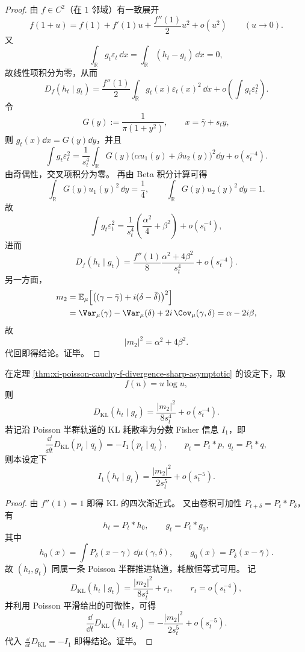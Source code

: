 \begin{proof}
由 \(f\in C^2\)（在 \(1\) 邻域）有一致展开
\[
f(1+u)=f(1)+f'(1)u+\frac{f''(1)}{2}u^2+o(u^2)\qquad(u\to0).
\]
又
\[
\int_{\mathbb R}g_t\varepsilon_t\,\dd x
=\int_{\mathbb R}(h_t-g_t)\,\dd x=0,
\]
故线性项积分为零，从而
\[
D_f(h_t\mid g_t)
=\frac{f''(1)}{2}\int_{\mathbb R}g_t(x)\varepsilon_t(x)^2\,\dd x
+o\!\left(\int g_t\varepsilon_t^2\right).
\]
令
\[
G(y):=\frac{1}{\pi(1+y^2)},
\qquad
x=\bar\gamma+s_t y,
\]
则 \(g_t(x)\dd x=G(y)\dd y\)，并且
\[
\int g_t\varepsilon_t^2
=\frac{1}{s_t^4}\int_{\mathbb R}G(y)\bigl(\alpha u_1(y)+\beta u_2(y)\bigr)^2\dd y
+o(s_t^{-4}).
\]
由奇偶性，交叉项积分为零。
再由 Beta 积分计算可得
\[
\int_{\mathbb R}G(y)u_1(y)^2\,\dd y=\frac14,
\qquad
\int_{\mathbb R}G(y)u_2(y)^2\,\dd y=1.
\]
故
\[
\int g_t\varepsilon_t^2
=\frac{1}{s_t^4}\left(\frac{\alpha^2}{4}+\beta^2\right)
+o(s_t^{-4}),
\]
进而
\[
D_f(h_t\mid g_t)
=\frac{f''(1)}{8}\frac{\alpha^2+4\beta^2}{s_t^4}
+o(s_t^{-4}).
\]
另一方面，
\[
\begin{aligned}
m_2
&=\mathbb E_\mu\!\left[\bigl((\gamma-\bar\gamma)+i(\delta-\bar\delta)\bigr)^2\right]\\
&=\Var_\mu(\gamma)-\Var_\mu(\delta)+2i\,\Cov_\mu(\gamma,\delta)
=\alpha-2i\beta,
\end{aligned}
\]
故
\[
|m_2|^2=\alpha^2+4\beta^2.
\]
代回即得结论。证毕。
\end{proof}

\begin{corollary}\label{cor:xi-poisson-cauchy-kl-fractional-fisher-fifth-law}
在定理 \ref{thm:xi-poisson-cauchy-f-divergence-sharp-asymptotic} 的设定下，取
\[
f(u)=u\log u,
\]
则
\[
D_{\mathrm{KL}}(h_t\mid g_t)
=\frac{|m_2|^2}{8s_t^4}
+o(s_t^{-4}).
\]
若记沿 Poisson 半群轨道的 KL 耗散率为分数 Fisher 信息 \(I_1\)，即
\[
\frac{\dd}{\dd t}D_{\mathrm{KL}}(p_t\mid q_t)=-I_1(p_t\mid q_t),
\qquad p_t=P_t*p,\ q_t=P_t*q,
\]
则本设定下
\[
I_1(h_t\mid g_t)
=\frac{|m_2|^2}{2s_t^5}
+o(s_t^{-5}).
\]
\end{corollary}
\begin{proof}
由 \(f''(1)=1\) 即得 KL 的四次渐近式。
又由卷积可加性 \(P_{t+\delta}=P_t*P_\delta\)，有
\[
h_t=P_t*h_0,\qquad
g_t=P_t*g_0,
\]
其中
\[
h_0(x)=\int P_\delta(x-\gamma)\,\dd\mu(\gamma,\delta),
\qquad
g_0(x)=P_{\bar\delta}(x-\bar\gamma).
\]
故 \((h_t,g_t)\) 同属一条 Poisson 半群推进轨道，耗散恒等式可用。
记
\[
D_{\mathrm{KL}}(h_t\mid g_t)=\frac{|m_2|^2}{8s_t^4}+r_t,\qquad r_t=o(s_t^{-4}),
\]
并利用 Poisson 平滑给出的可微性，可得
\[
\frac{\dd}{\dd t}D_{\mathrm{KL}}(h_t\mid g_t)
=-\frac{|m_2|^2}{2s_t^5}+o(s_t^{-5}).
\]
代入
\(
\frac{\dd}{\dd t}D_{\mathrm{KL}}=-I_1
\)
即得结论。证毕。
\end{proof}

